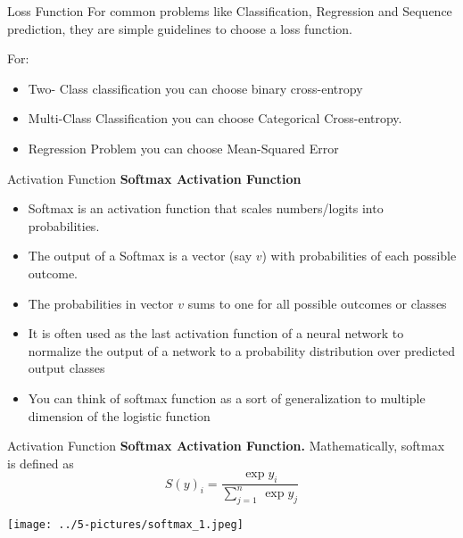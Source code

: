 \documentclass[11pt]{beamer}
\begin{document}
\begin{frame}{Loss Function}
For common problems like Classification, Regression and Sequence prediction, they are simple guidelines to choose a loss function. 

\vspace{0.5cm}
For: \begin{itemize}
\item Two- Class classification you can choose binary cross-entropy
\item Multi-Class Classification you can choose Categorical Cross-entropy.
\item Regression Problem you can choose Mean-Squared Error
\end{itemize}
\end{frame}
\begin{frame}{Activation Function}
\textbf{Softmax Activation Function} 
\vspace{0.5cm}
\begin{itemize}
\item Softmax is an activation function that scales numbers/logits into probabilities. 
\item The output of a Softmax is a vector (say $v$) with probabilities of each possible outcome. 
\item The probabilities in vector $v$ sums to one for all possible outcomes or classes 
\item It is often used as the last activation function of a neural network to normalize the output of a network to a probability distribution over predicted output classes
\item You can think of softmax function as a sort of generalization to multiple dimension of the logistic function
\end{itemize}
\end{frame}
\begin{frame}{Activation Function}
\textbf{Softmax Activation Function.} 
Mathematically, softmax is defined as
\begin{equation}
S(y)_i= \frac{\exp{y_i}}{\sum\limits_{j=1}^n \, \exp{y_j}}
\end{equation}
\begin{center}
\texttt{[image: ../5-pictures/softmax\_1.jpeg]} 
\end{center}
\end{frame}
\end{document}
